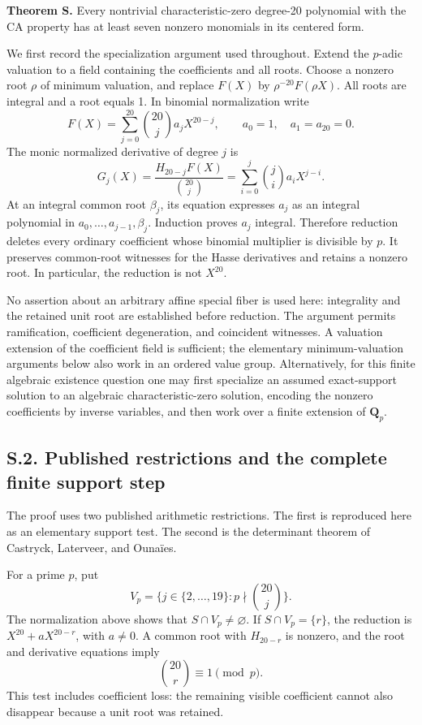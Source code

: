 \documentclass[
  british,
  10pt,
]{article}
\begin{document}
\textbf{Theorem S.} Every nontrivial characteristic-zero degree-20
polynomial with the CA property has at least seven nonzero monomials in
its centered form.

We first record the specialization argument used throughout. Extend the
\(p\)-adic valuation to a field containing the coefficients and all
roots. Choose a nonzero root \(\rho\) of minimum valuation, and replace
\(F(X)\) by \(\rho^{-20}F(\rho X)\). All roots are integral and a root
equals 1. In binomial normalization write \[
F(X)=\sum_{j=0}^{20}\binom{20}{j}a_jX^{20-j},
\qquad a_0=1,\quad a_1=a_{20}=0.
\] The monic normalized derivative of degree \(j\) is \[
G_j(X)=\frac{H_{20-j}F(X)}{\binom{20}{j}}
      =\sum_{i=0}^{j}\binom ji a_iX^{j-i}.
\] At an integral common root \(\beta_j\), its equation expresses
\(a_j\) as an integral polynomial in \(a_0,\ldots,a_{j-1},\beta_j\).
Induction proves \(a_j\) integral. Therefore reduction deletes every
ordinary coefficient whose binomial multiplier is divisible by \(p\). It
preserves common-root witnesses for the Hasse derivatives and retains a
nonzero root. In particular, the reduction is not \(X^{20}\).

No assertion about an arbitrary affine special fiber is used here:
integrality and the retained unit root are established before reduction.
The argument permits ramification, coefficient degeneration, and
coincident witnesses. A valuation extension of the coefficient field is
sufficient; the elementary minimum-valuation arguments below also work
in an ordered value group. Alternatively, for this finite algebraic
existence question one may first specialize an assumed exact-support
solution to an algebraic characteristic-zero solution, encoding the
nonzero coefficients by inverse variables, and then work over a finite
extension of \(\mathbf Q_p\).

\subsection{S.2. Published restrictions and the complete finite support
step}\label{s.2.-published-restrictions-and-the-complete-finite-support-step}

The proof uses two published arithmetic restrictions. The first is
reproduced here as an elementary support test. The second is the
determinant theorem of Castryck, Laterveer, and Ounaïes.

For a prime \(p\), put \[
V_p=\{j\in\{2,\ldots,19\}:p\nmid\binom{20}{j}\}.
\] The normalization above shows that \(S\cap V_p\ne\varnothing\). If
\(S\cap V_p=\{r\}\), the reduction is \(X^{20}+aX^{20-r}\), with
\(a\ne0\). A common root with \(H_{20-r}\) is nonzero, and the root and
derivative equations imply \[
\binom{20}{r}\equiv1\pmod p.
\tag{S2}
\] This test includes coefficient loss: the remaining visible
coefficient cannot also disappear because a unit root was retained.
\end{document}
